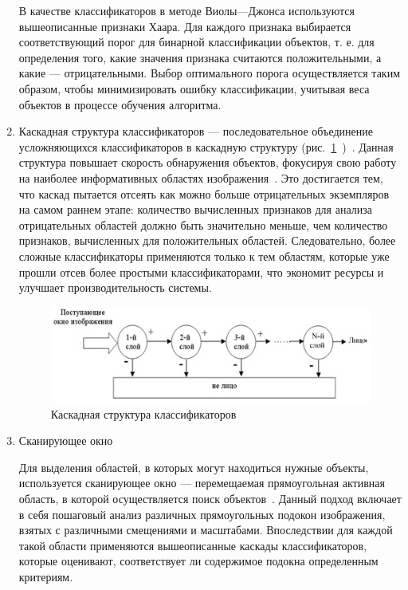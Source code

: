\begin{enumerate}[label=\arabic*.]
    В качестве классификаторов в методе Виолы---Джонса используются вышеописанные признаки Хаара. Для каждого признака выбирается соответствующий порог для бинарной классификации объектов, т. е. для определения того, какие значения признака считаются положительными, а какие --- отрицательными. Выбор оптимального порога осуществляется таким образом, чтобы минимизировать ошибку классификации, учитывая веса объектов в процессе обучения алгоритма.
    
    \item Каскадная структура классификаторов --- последовательное объединение усложняющихся классификаторов в каскадную структуру (рис.~\ref{img:cascade}~\cite{astrahan})~\cite{viola}. Данная структура повышает скорость обнаружения объектов, фокусируя свою работу на наиболее информативных областях изображения~\cite{tomsk}. Это достигается тем, что каскад пытается отсеять как можно больше отрицательных экземпляров на самом раннем этапе: количество вычисленных признаков для анализа отрицательных областей должно быть значительно меньше, чем количество признаков, вычисленных для положительных областей. Следовательно, более сложные классификаторы применяются только к тем областям, которые уже прошли отсев более простыми классификаторами, что экономит ресурсы и улучшает производительность системы.

    \begin{figure}[h]
	\centering
	\includegraphics[width=120mm,height=0.17\textheight]{img/cascade.jpg}
	\caption{Каскадная структура классификаторов}
    \label{img:cascade}
    \end{figure}

    \item Сканирующее окно

    Для выделения областей, в которых могут находиться нужные объекты, используется сканирующее окно --- перемещаемая прямоугольная активная область, в которой осуществляется поиск объектов~\cite{tula}. Данный подход включает в себя пошаговый анализ различных прямоугольных подокон изображения, взятых с различными смещениями и масштабами. Впоследствии для каждой такой области применяются вышеописанные каскады классификаторов, которые оценивают, соответствует ли содержимое подокна определенным критериям.

\end{enumerate}

